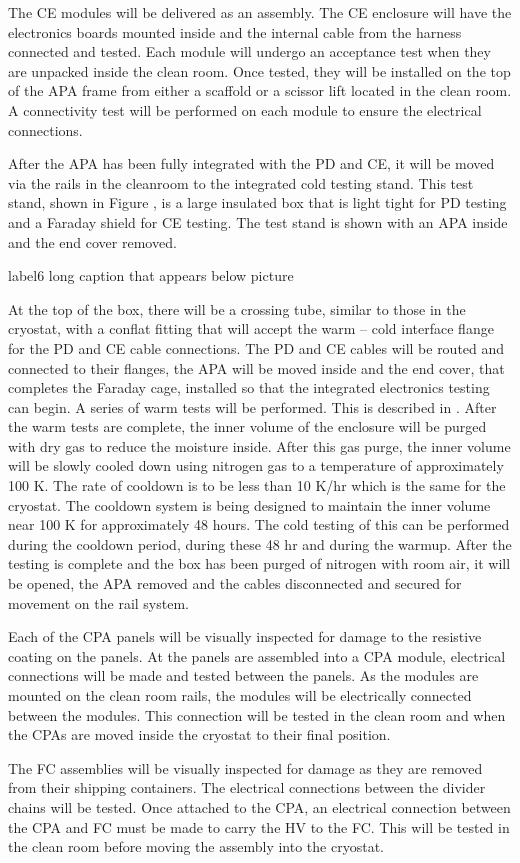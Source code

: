 The CE modules will be delivered as an assembly.  The CE enclosure will have the electronics boards mounted inside and the internal cable from the harness connected and tested.  Each module will undergo an acceptance test when they are unpacked inside the clean room.  Once tested, they will be installed on the top of the APA frame from either a scaffold or a scissor lift located in the clean room.  A connectivity test will be performed on each module to ensure the electrical connections.  

After the APA has been fully integrated with the PD and CE, it will be moved via the rails in the cleanroom to the integrated cold testing stand.  This test stand, shown in Figure , is a large insulated box that is light tight for PD testing and a Faraday shield for CE testing.  The test stand is shown with an APA inside and the end cover removed.  
%
\begin{cdrfigure}{label}{6 long caption that appears below picture}
\end{cdrfigure}
%
At the top of the box, there will be a crossing tube, similar to those in the cryostat, with a conflat fitting that will accept the warm – cold interface flange for the PD and CE cable connections.  The PD and CE cables will be routed and connected to their flanges, the APA will be moved inside and the end cover, that completes the Faraday cage, installed so that the integrated electronics testing can begin.  A series of warm tests will be performed.  This is described in .  After the warm tests are complete, the inner volume of the enclosure will be purged with dry gas to reduce the moisture inside.  After this gas purge, the inner volume will be slowly cooled down using nitrogen gas to a temperature of approximately 100 K.  The rate of cooldown is to be less than 10 K/hr which is the same for the cryostat.  The cooldown system is being designed to maintain the inner volume near 100 K for approximately 48 hours.  The cold testing of this can be performed during the cooldown period, during these 48 hr and during the warmup.  After the testing is complete and the box has been purged of nitrogen with room air, it will be opened, the APA removed and the cables disconnected and secured for movement on the rail system.   

Each of the CPA panels will be visually inspected for damage to the resistive coating on the panels.  At the panels are assembled into a CPA module, electrical connections will be made and tested between the panels.  As the modules are mounted on the clean room rails, the modules will be electrically connected between the modules.  This connection will be tested in the clean room and when the CPAs are moved inside the cryostat to their final position.  

The FC assemblies will be visually inspected for damage as they are removed from their shipping containers.  The electrical connections between the divider chains will be tested.  Once attached to the CPA, an electrical connection between the CPA and FC must be made to carry the HV to the FC.  This will be tested in the clean room before moving the assembly into the cryostat. 


